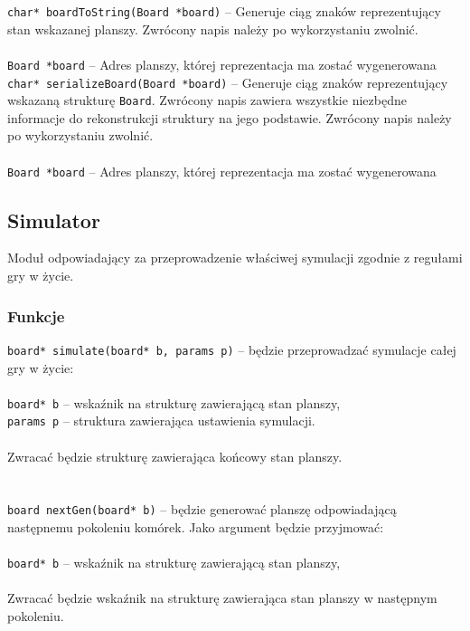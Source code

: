 \documentclass{article}
\begin{document}
\vspace*{8mm}
\noindent{}\texttt{char* boardToString(Board *board)} -- Generuje ciąg znaków reprezentujący stan wskazanej planszy. Zwrócony napis należy po wykorzystaniu zwolnić. \\ \\
\hspace*{10mm}\texttt{Board *board} -- Adres planszy, której reprezentacja ma zostać wygenerowana\\

\vspace*{8mm}
\noindent{}\texttt{char* serializeBoard(Board *board)} -- Generuje ciąg znaków reprezentujący wskazaną strukturę \texttt{Board}. Zwrócony napis zawiera wszystkie niezbędne informacje do rekonstrukcji struktury na jego podstawie. Zwrócony napis należy po wykorzystaniu zwolnić. \\ \\
\hspace*{10mm}\texttt{Board *board} -- Adres planszy, której reprezentacja ma zostać wygenerowana


\subsection{Simulator}
Moduł odpowiadający za przeprowadzenie właściwej symulacji zgodnie z regułami gry w życie.

\subsubsection{Funkcje}
\texttt{board* simulate(board* b, params p)} -- będzie przeprowadzać symulacje całej gry w życie:\\\\
	 \hspace*{10mm}\texttt{board* b} -- wskaźnik na strukturę zawierającą stan planszy,\\
	 \hspace*{10mm}\texttt{params p} -- struktura zawierająca ustawienia symulacji.\\
\\
Zwracać będzie strukturę zawierająca końcowy stan planszy.\\\\
\\
\texttt{board nextGen(board* b)} -- będzie generować planszę odpowiadającą następnemu pokoleniu komórek. Jako argument będzie przyjmować:\\\\
	 \hspace*{10mm}\texttt{board* b} -- wskaźnik na strukturę zawierającą stan planszy,\\
\\
Zwracać będzie wskaźnik na strukturę zawierająca stan planszy w następnym pokoleniu.
\end{document}
